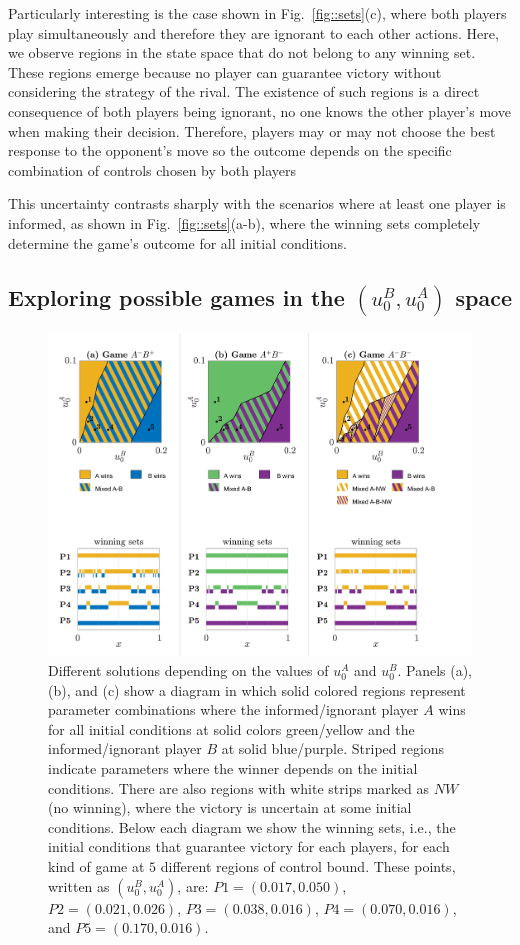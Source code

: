Particularly interesting is the case shown in Fig.~\ref{fig::sets}(c), where both players play simultaneously and therefore they are ignorant to each other actions. Here, we observe regions in the state space that do not belong to any winning set. These regions emerge because no player can guarantee victory without considering the strategy of the rival. The existence of such regions is a direct consequence of both players being ignorant, no one knows the other player's move when making their decision. Therefore, players may or may not choose the best response to the opponent's move so the outcome depends on the specific combination of controls chosen by both players

This uncertainty contrasts sharply with the scenarios where at least one player is informed, as shown in Fig.~\ref{fig::sets}(a-b), where the winning sets completely determine the game's outcome for all initial conditions.


\subsection{Exploring possible games in the $(u_0^B,u_0^A)$ space}

\begin{figure}
    \centering
    \includegraphics[trim={0.6cm 0cm 0cm 0cm}, clip,width=1.12\textwidth ]{Images/P5/franjas5.png}
    \caption{Different solutions depending on the values of $u^A_0$ and $u^B_0$. Panels (a), (b), and (c) show a diagram in which solid colored regions represent parameter combinations where the informed/ignorant player $A$ wins for all initial conditions at solid colors green/yellow and the informed/ignorant player $B$ at solid blue/purple. Striped regions indicate parameters where the winner depends on the initial conditions. There are also regions with white strips marked as $NW$ (no winning), where the victory is uncertain at some initial conditions. Below each diagram we show the winning sets, i.e., the initial conditions that guarantee victory for each players, for each kind of game at $5$ different regions of control bound. These points, written as $(u^B_0, u^A_0)$, are: $P1 =  (0.017, 0.050)$, $P2 =  (0.021, 0.026)$, $P3 =  (0.038, 0.016)$, $P4=  (0.070, 0.016)$, and $P5= (0.170, 0.016)$. 
    }
    \label{fig:franjas}
\end{figure}


